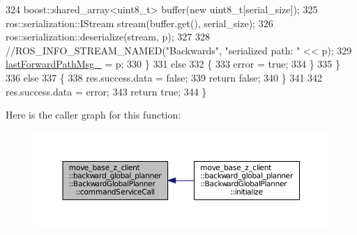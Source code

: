 \begin{DoxyCode}
324             boost::shared\_array<uint8\_t> buffer(\textcolor{keyword}{new} uint8\_t[serial\_size]);
325             ros::serialization::IStream stream(buffer.get(), serial\_size);
326             ros::serialization::deserialize(stream, p);
327 
328             \textcolor{comment}{//ROS\_INFO\_STREAM\_NAMED("Backwards", "serialized path: " << p);}
329             \hyperlink{classmove__base__z__client_1_1backward__global__planner_1_1BackwardGlobalPlanner_a058da13b9ee6b1d878830503e67de638}{lastForwardPathMsg\_} = p;
330         \}
331         \textcolor{keywordflow}{else}
332         \{
333             error = \textcolor{keyword}{true};
334         \}
335     \}
336     \textcolor{keywordflow}{else}
337     \{
338         res.success.data = \textcolor{keyword}{false};
339         \textcolor{keywordflow}{return} \textcolor{keyword}{false};
340     \}
341 
342     res.success.data = error;
343     \textcolor{keywordflow}{return} \textcolor{keyword}{true};
344 \}
\end{DoxyCode}


Here is the caller graph for this function\+:
\nopagebreak
\begin{figure}[H]
\begin{center}
\leavevmode
\includegraphics[width=350pt]{classmove__base__z__client_1_1backward__global__planner_1_1BackwardGlobalPlanner_ad6f5fb1f85f6869b06bd4cb0feada148_icgraph}
\end{center}
\end{figure}


